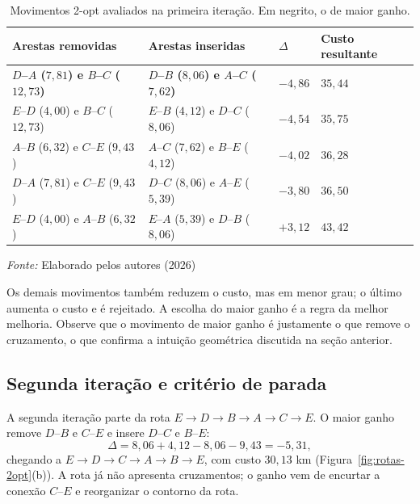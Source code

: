 \begin{table}[htb]
\centering
\caption{Movimentos 2-opt avaliados na primeira iteração. Em negrito, o de maior ganho.}
\label{tab:candidatos-2opt}
\small
\renewcommand{\arraystretch}{1.2}
\begin{tabular}{|>{\raggedright\arraybackslash}p{4.6cm}|>{\raggedright\arraybackslash}p{4.2cm}|>{\raggedright\arraybackslash}p{1.3cm}|>{\raggedright\arraybackslash}p{2.1cm}|}
\hline
\rowcolor{gray!20}
\textbf{Arestas removidas} & \textbf{Arestas inseridas} & \textbf{$\Delta$} & \textbf{Custo resultante} \\ \hline
\textbf{$D$--$A$ ($7{,}81$) e $B$--$C$ ($12{,}73$)} & \textbf{$D$--$B$ ($8{,}06$) e $A$--$C$ ($7{,}62$)} & \textbf{$-4{,}86$} & \textbf{$35{,}44$} \\ \hline
$E$--$D$ ($4{,}00$) e $B$--$C$ ($12{,}73$) & $E$--$B$ ($4{,}12$) e $D$--$C$ ($8{,}06$) & $-4{,}54$ & $35{,}75$ \\ \hline
$A$--$B$ ($6{,}32$) e $C$--$E$ ($9{,}43$) & $A$--$C$ ($7{,}62$) e $B$--$E$ ($4{,}12$) & $-4{,}02$ & $36{,}28$ \\ \hline
$D$--$A$ ($7{,}81$) e $C$--$E$ ($9{,}43$) & $D$--$C$ ($8{,}06$) e $A$--$E$ ($5{,}39$) & $-3{,}80$ & $36{,}50$ \\ \hline
$E$--$D$ ($4{,}00$) e $A$--$B$ ($6{,}32$) & $E$--$A$ ($5{,}39$) e $D$--$B$ ($8{,}06$) & $+3{,}12$ & $43{,}42$ \\ \hline
\end{tabular}

\footnotesize{\textit{Fonte:} Elaborado pelos autores (2026)}
\end{table}

Os demais movimentos também reduzem o custo, mas em menor grau; o último aumenta o custo e é rejeitado. A escolha do maior ganho é a regra da melhor melhoria. Observe que o movimento de maior ganho é justamente o que remove o cruzamento, o que confirma a intuição geométrica discutida na seção anterior.

\subsection{Segunda iteração e critério de parada}

A segunda iteração parte da rota $E \rightarrow D \rightarrow B \rightarrow A \rightarrow C \rightarrow E$. O maior ganho remove $D$--$B$ e $C$--$E$ e insere $D$--$C$ e $B$--$E$:
\begin{equation}
    \Delta = 8{,}06 + 4{,}12 - 8{,}06 - 9{,}43 = -5{,}31,
    \label{eq:segunda-troca}
\end{equation}
chegando a $E \rightarrow D \rightarrow C \rightarrow A \rightarrow B \rightarrow E$, com custo $30{,}13$ km (Figura~\ref{fig:rotas-2opt}(b)). A rota já não apresenta cruzamentos; o ganho vem de encurtar a conexão $C$--$E$ e reorganizar o contorno da rota.

